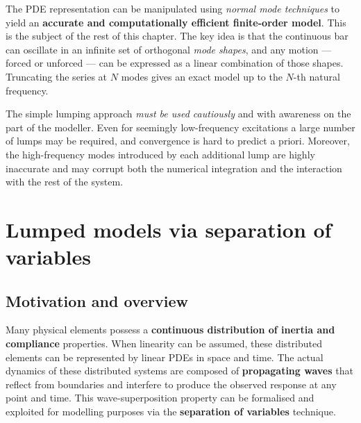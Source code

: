 \begin{insightbox}
  The PDE representation can be manipulated using
  \emph{normal mode techniques} to yield an \textbf{accurate and
  computationally efficient finite-order model}.  This is the subject of the
  rest of this chapter.  The key idea is that the continuous bar can oscillate
  in an infinite set of orthogonal \emph{mode shapes}, and any motion ---
  forced or unforced --- can be expressed as a linear combination of those
  shapes.  Truncating the series at $N$ modes gives an exact model up to the
  $N$-th natural frequency.
\end{insightbox}

\begin{warningbox}
  The simple lumping approach \emph{must be used cautiously} and with awareness
  on the part of the modeller.  Even for seemingly low-frequency excitations a
  large number of lumps may be required, and convergence is hard to predict a
  priori.  Moreover, the high-frequency modes introduced by each additional lump
  are highly inaccurate and may corrupt both the numerical integration and the
  interaction with the rest of the system.
\end{warningbox}


\section{Lumped models via separation of variables}
\label{sec:modal}

\subsection{Motivation and overview}
\label{ssec:modal_intro}

Many physical elements possess a \textbf{continuous distribution of inertia and
compliance} properties.  When linearity can be assumed, these distributed elements
can be represented by linear PDEs in space and time.  The actual dynamics of these
distributed systems are composed of \textbf{propagating waves} that reflect from
boundaries and interfere to produce the observed response at any point and time.
This wave-superposition property can be formalised and exploited for modelling
purposes via the \textbf{separation of variables} technique.

